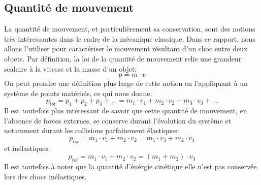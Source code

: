 \subsection{Quantité de mouvement}
La quantité de mouvement, et particulièrement sa conservation, sont des notions très intéressantes dans le cadre de la mécanique classique. Dans ce rapport, nous allons l'utiliser pour caractériser le mouvement résultant d'un choc entre deux objets.
Par définition, la loi de la quantité de mouvement relie une grandeur scalaire à la vitesse et la masse d'un objet:
\begin{equation}
    p = m \cdot v
\end{equation}
On peut prendre une définition plus large de cette notion en l'appliquant à un système de points matériels, ce qui nous donne:
\begin{equation}
    p_{tot} = p_1 + p_2 + p_3 +... = m_1 \cdot v_1 + m_2 \cdot v_2 + m_3 \cdot v_3 +...
\end{equation}
Il est toutefois plus intéressant de savoir que cette quantité de mouvement, en l'absence de forces externes, se conserve durant l'évolution du système et notamment durant les collisions parfaitement élastiques:
\begin{equation}
    p_{tot} = m_1 \cdot v_1 + m_2 \cdot v_2 = m_1 \cdot v_3 + m_2 \cdot v_4
\end{equation}
et inélastiques:
\begin{equation}
    p_{tot} = m_1 \cdot v_1 + m_2 \cdot v_2 = (m_1 + m_2) \cdot v_3
\end{equation}
Il est toutefois à noter que la quantité d'énérgie cinétique elle n'est pas conservée lors des chocs inélastiques.
